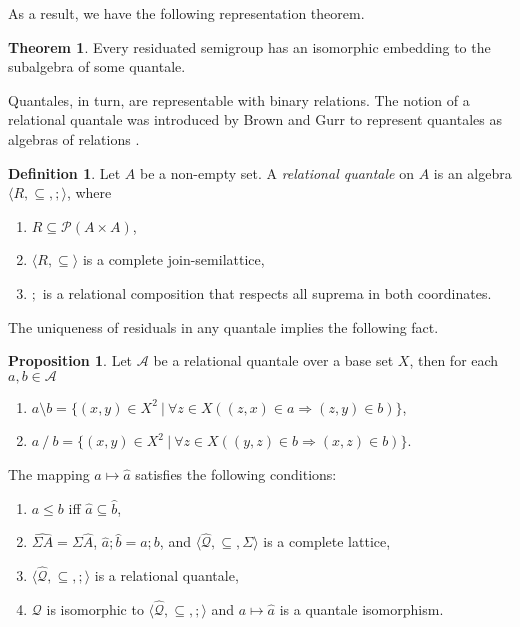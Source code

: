 \documentclass[a4paper]{article}
\theoremstyle{definition}
\newtheorem{definition}{Definition}
\theoremstyle{theorem}
\newtheorem{theorem}{Theorem}
\theoremstyle{proposition}
\newtheorem{proposition}{Proposition}
\theoremstyle{lemma}
\theoremstyle{ex}
\theoremstyle{corollary}
\theoremstyle{claim}
\begin{document}
As a result, we have the following representation theorem.

\begin{theorem} \label{orsRep}
  Every residuated semigroup has an isomorphic embedding to the subalgebra of some quantale.
\end{theorem}

Quantales, in turn, are representable with binary relations. The notion of a relational quantale was introduced by Brown and Gurr to represent quantales as algebras of relations \cite{brown1993representation}.
\begin{definition}
  Let $A$ be a non-empty set. A \emph{relational quantale} on $A$ is an algebra $\langle R, \subseteq, ; \rangle$, where
  \begin{enumerate}
    \item $R \subseteq \mathcal{P}(A \times A)$,
    \item $\langle R, \subseteq \rangle$ is a complete join-semilattice,
    \item $;$ is a relational composition that respects all suprema in both coordinates.
  \end{enumerate}
\end{definition}

The uniqueness of residuals in any quantale implies the following fact.
\begin{proposition}\label{ok}
  Let $\mathcal{A}$ be a relational quantale over a base set $X$, then for each $a, b \in \mathcal{A}$
  \begin{enumerate}
    \item $a \setminus b = \{ (x, y) \in X^2 \: | \: \forall z \in X ( (z, x) \in a \Rightarrow (z, y) \in b) \}$,
    \item $a \: / \: b = \{ (x, y) \in X^2 \: | \: \forall z \in X ( (y, z) \in b \Rightarrow (x, z) \in b )\}$.
  \end{enumerate}
\end{proposition}

The mapping $a \mapsto \hat{a}$ satisfies the following conditions:

\begin{enumerate}
\item $a \leq b$ iff $\hat{a} \subseteq \hat{b}$,

\item $\widehat{\Sigma A} = \Sigma \widehat{A}$, $\hat{a} ; \hat{b} = \widehat{a ; b}$, and $\langle \widehat{\mathcal{Q}}, \subseteq, \Sigma \rangle$ is a complete lattice,

\item $\langle \widehat{\mathcal{Q}}, \subseteq, ; \rangle$ is a relational quantale,

\item $\mathcal{Q}$ is isomorphic to $\langle \widehat{\mathcal{Q}}, \subseteq, ; \rangle$ and $a \mapsto \hat{a}$ is a quantale isomorphism.
\end{enumerate}
\end{document}

